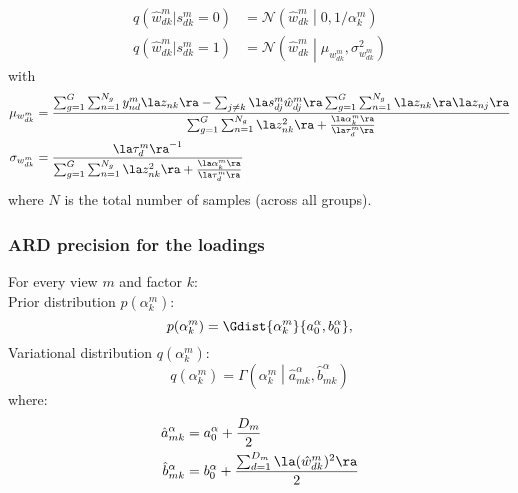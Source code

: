 \begin{equation} \begin{aligned}
      q(\hat{w}_{dk}^m|s_{dk}^m=0) &= \mathcal{N} \left(\hat{w}_{dk}^m \middle| 0, 1/\alpha_k^m \right) \\
      q(\hat{w}_{dk}^m|s_{dk}^m=1) &= \mathcal{N} \left( \hat{w}_{dk}^m \middle| \mu_{w_{dk}^m}, \sigma_{w_{dk}^m}^2\right)
  \end{aligned} \end{equation}
with
\begin{equation} \begin{aligned}
  	\mu_{w_{dk}^m} &= \frac{ \sum_{g=1}^G\sum_{n=1}^{N_g} y_{nd}^m \la z_{nk} \ra - \sum_{j \neq k} \la s_{dj}^m\hat{w}_{dj}^m \ra \sum_{g=1}^G\sum_{n=1}^{N_g} \la z_{nk} \ra \la z_{nj} \ra } { \sum_{g=1}^G\sum_{n=1}^{N_g} \la z_{nk}^2 \ra + \frac{\la\alpha_k^m\ra}{\la\tau_d^m\ra} }\\
  	\sigma_{w_{dk}^m} &= \frac{ \la\tau_d^m\ra^{-1} } { \sum_{g=1}^G\sum_{n=1}^{N_g} \la z_{nk}^2 \ra + \frac{\la\alpha_k^m\ra}{\la\tau_d^m\ra} }
\end{aligned} \end{equation}
where $N$ is the total number of samples (across all groups).



\subsubsection{ARD precision for the loadings}
For every view $m$ and factor $k$: \\

Prior distribution $p(\alpha_k^m)$:
\[
	p(\alpha_k^m) = \Gdist{\alpha_k^m}{a_0^\alpha, b_0^\alpha},
\]
Variational distribution $q(\alpha_k^m)$:
\begin{equation}
    q(\alpha^m_{k}) = \Gamma \left( \alpha_k^m \middle| \hat{a}_{mk}^{\alpha}, \hat{b}_{mk}^{\alpha} \right)
\end{equation}
where:
\begin{equation} \begin{aligned}
	\hat{a}_{mk}^\alpha &= a_0^\alpha + \frac{D_m}{2}\\
	\hat{b}_{mk}^\alpha &= b_0^\alpha +\frac{ \sum_{d=1}^{D_m} \la (\hat{w}_{dk}^m)^2 \ra }{2}
\end{aligned} \end{equation}


